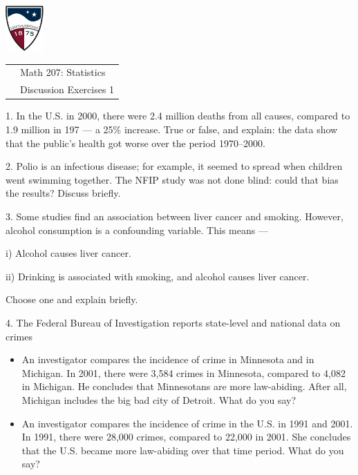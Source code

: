 \documentclass[10pt]{article}
\begin{document}
\pagestyle{empty}

\href{http://www.su.edu}{\includegraphics[height=1.75cm]{sulogo.eps}}
\vspace{-1.69cm}

{\small
\begin{tabular}{cl}
\hspace{5in} & Math 207:  Statistics\\
                & Discussion Exercises 1\\
\end{tabular}
}

\setlength{\baselineskip}{1.05\baselineskip}
\bigskip\bigskip


1. In the U.S. in 2000, there were 2.4 million deaths from all causes, compared to 1.9 million in 
197 --- a 25\% increase.  True or false, and explain:  the data show that the public's health got 
worse over the period 1970--2000.
\vspace{.5in}

2. Polio is an infectious disease;  for example, it seemed to spread when children went swimming together.  
The NFIP study was not done blind:  could that bias the results?  Discuss briefly.
\vspace{.5in}

3. Some studies find an association between liver cancer and smoking.  However,
alcohol consumption is a confounding variable.  This means ---

\hspace{10pt} i) Alcohol causes liver cancer.

\hspace{10pt} ii) Drinking is associated with smoking, and alcohol causes liver cancer.

Choose one and explain briefly.
\vspace{.5in}

4. The Federal Bureau of Investigation reports state-level and national data on crimes

\begin{itemize}
\item An investigator compares the incidence of crime in Minnesota and in Michigan.  
In 2001, there were 3,584 crimes in Minnesota, compared to 4,082 in Michigan.  
He concludes that Minnesotans are more law-abiding.  After all, Michigan includes the big bad
city of Detroit.  What do you say?\vspace{.5in}
%
\item An investigator compares the incidence of crime in the U.S. in 1991 and 2001.  In 1991, there
were 28,000 crimes, compared to 22,000 in 2001.  She concludes that
the U.S. became more law-abiding over that time period.  What do you say?
\end{itemize}
\vspace{.5in}
\end{document}
